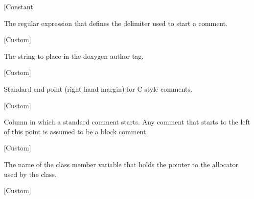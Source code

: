 \vspace{1em}
\noindent
{}
\usebox{\funcname}
 \hfill [Constant]

\begin{doc-string}
The regular expression that defines the delimiter used to start
a comment.
\end{doc-string}

\vspace{1em}
\noindent
{}
\usebox{\funcname}
 \hfill [Custom]

\begin{doc-string}
The string to place in the doxygen author tag.
\end{doc-string}

\vspace{1em}
\noindent
{}
\usebox{\funcname}
 \hfill [Custom]

\begin{doc-string}
Standard end point (right hand margin) for C style comments.
\end{doc-string}

\vspace{1em}
\noindent
{}
\usebox{\funcname}
 \hfill [Custom]

\begin{doc-string}
Column in which a standard comment starts.  Any comment that starts to the left of
this point is assumed to be a block comment.
\end{doc-string}

\vspace{1em}
\noindent
{}
\usebox{\funcname}
 \hfill [Custom]

\begin{doc-string}
The name of the class member variable that holds the pointer to the allocator
used by the class.
\end{doc-string}

\vspace{1em}
\noindent
{}
\usebox{\funcname}
 \hfill [Custom]

